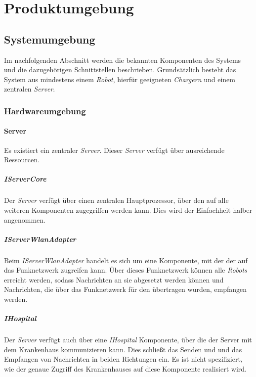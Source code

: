 \section{Produktumgebung}

  \subsection{Systemumgebung}
  Im nachfolgenden Abschnitt werden die bekannten Komponenten des Systems
  und die dazugehörigen Schnittstellen beschrieben. Grundsätzlich besteht
  das System aus mindestens einem \emph{Robot}, hierfür geeigneten
  \emph{Chargern} und einem zentralen \emph{Server}.

    \subsubsection{Hardwareumgebung}
    \paragraph{Server}\label{server} \newline

    Es existiert ein zentraler \emph{Server}. Dieser \emph{Server} verfügt
    über ausreichende Ressourcen.

    \subparagraph{IServerCore}\label{iservercore} \newline

    Der \emph{Server} verfügt über einen zentralen Hauptprozessor, über den
    auf alle weiteren Komponenten zugegriffen werden kann. Dies wird der
    Einfachheit halber angenommen.

    \subparagraph{IServerWlanAdapter}\label{iserverwlanadapter} \newline

    Beim \emph{IServerWlanAdapter} handelt es sich um eine Komponente, mit der der 
    auf das Funknetzwerk zugreifen kann. Über dieses Funknetzwerk können alle
    \emph{Robots} erreicht werden, sodass Nachrichten an sie abgesetzt werden können
    und Nachrichten, die über das Funknetzwerk für den  übertragen wurden,
    empfangen werden.

    \subparagraph{IHospital}\label{ihospital} \newline

    Der \emph{Server} verfügt auch über eine \emph{IHospital} Komponente, über die
    der Server mit dem Krankenhaus kommunizieren kann. Dies schließt das Senden und
    und das Empfangen von Nachrichten in beiden Richtungen ein. Es ist nicht spezifiziert,
    wie der genaue Zugriff des Krankenhauses auf diese Komponente realisiert wird.

